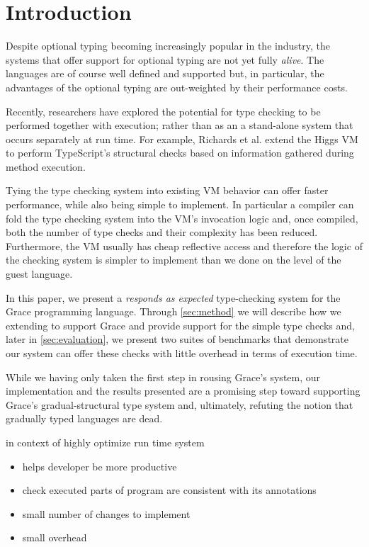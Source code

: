 
\section{Introduction}
\label{sec:introduction}

Despite optional typing becoming increasingly popular in the industry, the systems that offer support for optional typing are not yet fully \emph{alive}. The languages are of course well defined and supported but, in particular, the advantages of the optional typing are out-weighted by their performance costs. 

Recently, researchers have explored the potential for type checking to be performed together with execution; rather than as an a stand-alone system that occurs separately at run time. For example, Richards et al. extend the Higgs VM to perform TypeScript's structural checks based on information gathered during method execution. 

Tying the type checking system into existing VM behavior can offer faster performance, while also being simple to implement. In particular a compiler can fold the type checking system into the VM's invocation logic and, once compiled, both the number of type checks and their complexity has been reduced. Furthermore, the VM usually has cheap reflective access and therefore the logic of the checking system is simpler to implement than we done on the level of the guest language.

In this paper, we present a \emph{responds as expected} type-checking system for the Grace programming language. Through \cref{sec:method} we will describe how we extending \SOMns to support Grace and provide support for the simple type checks and, later in \cref{sec:evaluation}, we present two suites of benchmarks that demonstrate our system can offer these checks with little overhead in terms of execution time.

While we having only taken the first step in rousing Grace's system, our implementation and the results presented are a promising step toward supporting Grace's gradual-structural type system and, ultimately, refuting the notion that gradually typed languages are dead.


in context of highly optimize run time system

\begin{itemize}
\item helps developer be more productive
\item check executed parts of program are consistent with its annotations
\item small number of changes to implement
\item small overhead
\end{itemize}